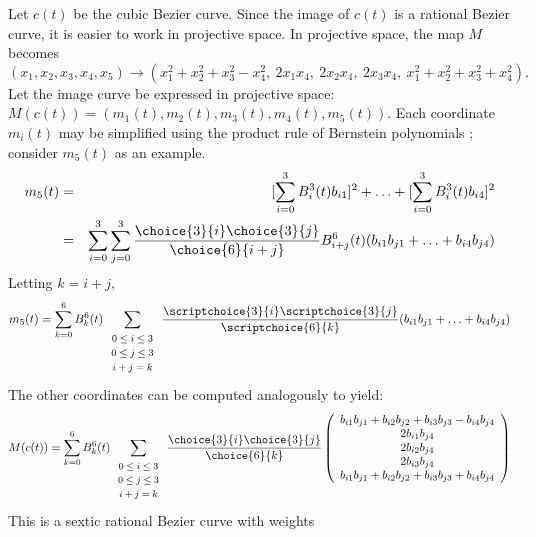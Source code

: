 \documentclass[11pt]{article}
\begin{document}
\prf
Let $c(t)$ be the cubic Bezier curve.
Since the image of $c(t)$ is a rational Bezier curve, it is easier 
to work in projective space.
In projective space, the map $M$ becomes
\[
	 (x_1,x_2,x_3,x_4,x_5) \rightarrow
	 (x_1^2 + x_2^2 + x_3^2 - x_4^2,\ 
	 2x_1 x_4,\ 2x_2 x_4,\ 2x_3 x_4,\ 
	 x_1^2 + x_2^2 + x_3^2 + x_4^2).
\]
Let the image curve be expressed in projective space: 
$M(c(t)) = (m_1(t),m_2(t),m_3(t),m_4(t),m_5(t))$.
Each coordinate $m_i(t)$ may be simplified using the product rule 
of Bernstein polynomials \cite{farin02};
consider $m_5(t)$ as an example.
\begin{eqnarray}
m_5(t) & = & [\sum_{i=0}^3 B_i^3(t) b_{i1}]^2 + 
	\ldots + [\sum_{i=0}^3 B_i^3(t) b_{i4}]^2 \nonumber \\
     & = &  \sum_{i=0}^3 \sum_{j=0}^3 
	\frac{\choice{3}{i} \choice{3}{j}}{\choice{6}{i+j}}
       B^6_{i+j}(t) (b_{i1} b_{j1} + \ldots + b_{i4} b_{j4}) \nonumber
\end{eqnarray}
Letting $k=i+j$, 
\[ m_5(t) = \sum_{k=0}^6 B_k^6(t) 
	\sum_{\begin{array}{c}  \mbox{\footnotesize{$0 \leq i \leq 3$}} \\ 
			     \mbox{\footnotesize{$0 \leq j \leq 3$}} \\ 
			     \mbox{\footnotesize{$i+j=k$}}
			     \end{array}} 
	\frac{\scriptchoice{3}{i} \scriptchoice{3}{j}}{\scriptchoice{6}{k}}
	(b_{i1} b_{j1} + \ldots + b_{i4} b_{j4}) \]
The other coordinates can be computed analogously to yield:
\[ M(c(t)) = 
   \sum_{k=0}^6 B_k^6(t)
	\sum_{\begin{array}{c}  \mbox{\footnotesize{$0 \leq i \leq 3$}} \\ 
			     \mbox{\footnotesize{$0 \leq j \leq 3$}} \\ 
			     \mbox{\footnotesize{$i+j=k$}}
			     \end{array}} 
	\frac{\choice{3}{i} \choice{3}{j}}{\choice{6}{k}}
	\left( \begin{array}{c}
            b_{i1} b_{j1} + b_{i2} b_{j2} + b_{i3} b_{j3} - b_{i4} b_{j4} \\
            2b_{i1} b_{j4} \\
            2b_{i2} b_{j4} \\
            2b_{i3} b_{j4} \\
            b_{i1} b_{j1} + b_{i2} b_{j2} + b_{i3} b_{j3} + b_{i4} b_{j4}
	\end{array} \right) \]
This is a sextic rational Bezier curve with weights 
\end{document}
